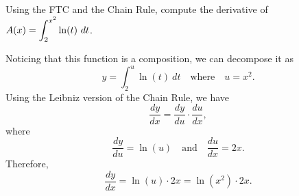 \begin{example} %
Using the FTC and the Chain Rule, compute the derivative of $\displaystyle A(x) = \int_2^{x^2} \ln(t) \ dt$.

\solution Noticing that this function is a composition, we can decompose it as
\[ y = \int_2^u \ln(t) \ dt \quad \mbox{where} \quad u = x^2. \]
Using the Leibniz version of the Chain Rule, we have
\[ \frac{dy}{dx} = \frac{dy}{du} \cdot \frac{du}{dx}, \] 
where
\[ \frac{dy}{du} = \ln(u) \quad \mbox{and} \quad \frac{du}{dx} = 2x. \]
Therefore,
\[ \frac{dy}{dx} = \ln(u) \cdot 2x = \ln \left( x^2 \right) \cdot 2x. \]
\end{example}